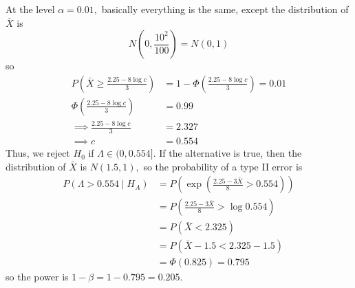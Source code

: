 \documentclass{article}
\begin{document}
\begin{itemize}
\begin{soln}
			At the level $\alpha=0.01,$ basically everything is the same, except the distribution of $\bar{X}$ is \[N\left( 0, \frac{10^2}{100} \right) = N(0, 1)\] so
			\begin{align*}
				P\left( \bar{X}\ge \frac{2.25-8\log c}{3} \right) &= 1-\Phi\left( \frac{2.25-8\log c}{3} \right) = 0.01 \\
				\Phi\left( \frac{2.25-8\log c}{3} \right) &= 0.99 \\
				\implies \frac{2.25-8\log c}{3} &= 2.327 \\
				\implies c &= 0.554
			\end{align*}
			Thus, we reject $H_0$ if $\Lambda\in (0, 0.554].$ If the alternative is true, then the distribution of $\bar{X}$ is $N(1.5, 1),$ so the probability of a type II error is
			\begin{align*}
				P(\Lambda>0.554\mid H_A) &= P\left( \exp\left( \frac{2.25-3\bar{X}}{8}>0.554 \right) \right) \\
				&= P\left( \frac{2.25-3\bar{X}}{8}>\log 0.554 \right) \\
				&= P(\bar{X}<2.325) \\
				&= P(\bar{X}-1.5 < 2.325-1.5) \\
				&= \Phi(0.825) = 0.795
			\end{align*} so the power is $1-\beta=1-0.795=0.205.$
			
		\end{soln}
		
\end{itemize}
\end{document}
